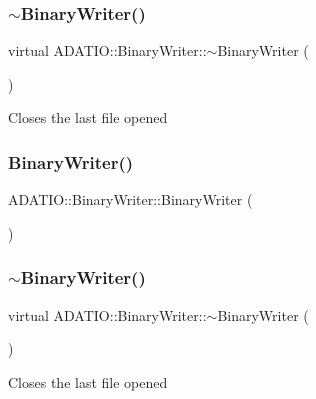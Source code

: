 \subsubsection{\texorpdfstring{$\sim$BinaryWriter()}{~BinaryWriter()}\hspace{0.1cm}{\footnotesize\ttfamily [2/3]}}
{\footnotesize\ttfamily virtual A\+D\+A\+T\+I\+O\+::\+Binary\+Writer\+::$\sim$\+Binary\+Writer (\begin{DoxyParamCaption}{ }\end{DoxyParamCaption})\hspace{0.3cm}{\ttfamily [virtual]}}

Closes the last file opened \mbox{\label{classADATIO_1_1BinaryWriter_ab3eb202f6fb06059cf4dd2eba12280cf}} 
\subsubsection{\texorpdfstring{BinaryWriter()}{BinaryWriter()}\hspace{0.1cm}{\footnotesize\ttfamily [3/3]}}
{\footnotesize\ttfamily A\+D\+A\+T\+I\+O\+::\+Binary\+Writer\+::\+Binary\+Writer (\begin{DoxyParamCaption}{ }\end{DoxyParamCaption})}

\mbox{\label{classADATIO_1_1BinaryWriter_a1c72b62cb3f48829de9f79f88ba618fd}} 
\subsubsection{\texorpdfstring{$\sim$BinaryWriter()}{~BinaryWriter()}\hspace{0.1cm}{\footnotesize\ttfamily [3/3]}}
{\footnotesize\ttfamily virtual A\+D\+A\+T\+I\+O\+::\+Binary\+Writer\+::$\sim$\+Binary\+Writer (\begin{DoxyParamCaption}{ }\end{DoxyParamCaption})\hspace{0.3cm}{\ttfamily [virtual]}}

Closes the last file opened 


